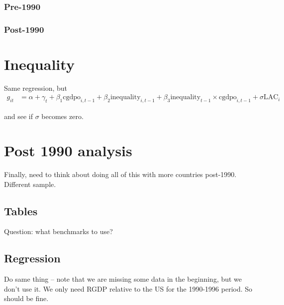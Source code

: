 \documentclass[12pt,english]{article}
\theoremstyle{remark}
\begin{document}
\subsubsection{Pre-1990}

 


\subsubsection{Post-1990}




\section{Inequality}

\normalsize

Same regression, but
\begin{align}
g_{it} &= \alpha + \gamma_t + \beta_1 \textrm{cgdpo}_{i,t-1} + \beta_2 \textrm{inequality}_{i,t-1} + \beta_3 \textrm{inequality}_{t-1} \times \textrm{cgdpo}_{i,t-1} + \sigma \textrm{LAC}_i
\end{align}

and see if $\sigma$ becomes zero.


\section{Post 1990 analysis}

Finally, need to think about doing all of this with more countries post-1990. Different sample. 

\subsection{Tables}

Question: what benchmarks to use?

\subsection{Regression}

Do same thing -- note that we are missing some data in the beginning, but we don't use it. We only need RGDP relative to the US for the 1990-1996 period. So should be fine. 
\end{document}
